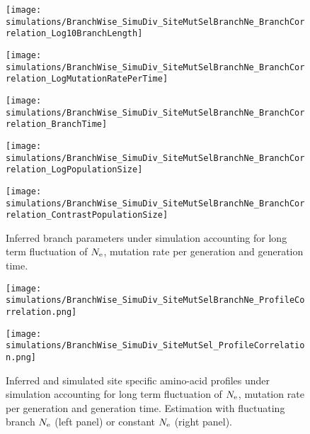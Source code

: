 \begin{figure}[H]
    \centering
    \begin{minipage}{0.32\linewidth}
        \texttt{[image: simulations/BranchWise\_SimuDiv\_SiteMutSelBranchNe\_BranchCorrelation\_Log10BranchLength]}
    \end{minipage} \hfill
    \begin{minipage}{0.32\linewidth}
        \texttt{[image: simulations/BranchWise\_SimuDiv\_SiteMutSelBranchNe\_BranchCorrelation\_LogMutationRatePerTime]}
    \end{minipage} \hfill
    \begin{minipage}{0.32\linewidth}
        \texttt{[image: simulations/BranchWise\_SimuDiv\_SiteMutSelBranchNe\_BranchCorrelation\_BranchTime]}
    \end{minipage} \hfill
    \begin{minipage}{0.32\linewidth}
        \texttt{[image: simulations/BranchWise\_SimuDiv\_SiteMutSelBranchNe\_BranchCorrelation\_LogPopulationSize]}
    \end{minipage}
    \begin{minipage}{0.32\linewidth}
        \texttt{[image: simulations/BranchWise\_SimuDiv\_SiteMutSelBranchNe\_BranchCorrelation\_ContrastPopulationSize]}
    \end{minipage} \hfill
    \caption[Inferred branch parameters for SimuDiv]{
    Inferred branch parameters under simulation accounting for long term fluctuation of $N_{\mathrm{e}}$, mutation rate per generation and generation time.
    }
\end{figure}


\begin{figure}[H]
    \centering
    \begin{minipage}{0.49\linewidth}
        \texttt{[image: simulations/BranchWise\_SimuDiv\_SiteMutSelBranchNe\_ProfileCorrelation.png]}
    \end{minipage} \hfill
    \begin{minipage}{0.49\linewidth}
        \texttt{[image: simulations/BranchWise\_SimuDiv\_SiteMutSel\_ProfileCorrelation.png]}
    \end{minipage}
    \caption[Inferred site amino-acid profiles for SimuDiv]{
    Inferred and simulated site specific amino-acid profiles under simulation accounting for long term fluctuation of $N_{\mathrm{e}}$, mutation rate per generation and generation time.
    Estimation with fluctuating branch $N_{\mathrm{e}}$ (left panel) or constant $N_{\mathrm{e}}$ (right panel).}
\end{figure}

